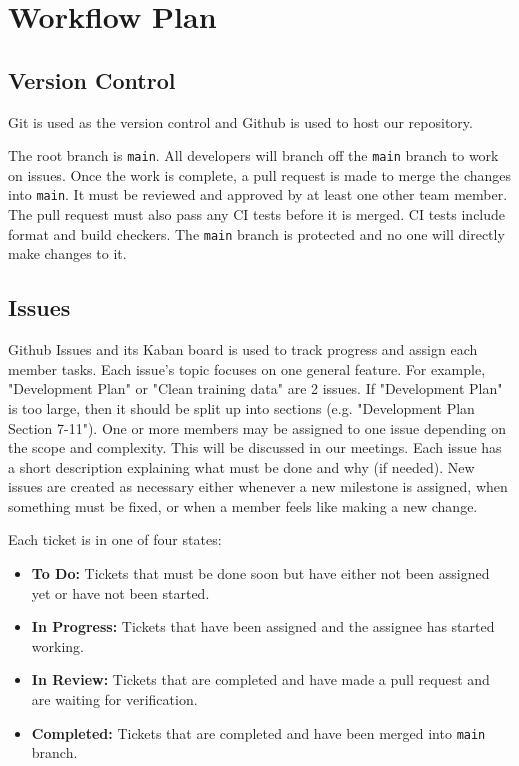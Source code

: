 \documentclass{article}
\begin{document}
\section{Workflow Plan}

\subsection{Version Control}
Git is used as the version control and Github is used to host our repository.

The root branch is \verb|main|. All developers will branch off the \verb|main| branch to work on
issues. Once the work is complete, a pull request is made to merge the changes into \verb|main|.
It must be reviewed and approved by at least one other team member. The pull request must also 
pass any CI tests before it is merged. CI tests include format and build checkers. The \verb|main| 
branch is protected and no one will directly make changes to it.

\subsection{Issues}
Github Issues and its Kaban board is used to track progress and assign each member tasks. Each 
issue's topic focuses on one general feature. For example, "Development Plan" or "Clean training 
data" are 2 issues. If "Development Plan" is too large, then it should be split up into sections
(e.g. "Development Plan Section 7-11"). One or more members may be assigned to one issue depending 
on the scope and complexity. This will be discussed in our meetings. Each issue has a short 
description explaining what must be done and why (if needed). New issues are created as necessary
either whenever a new milestone is assigned, when something must be fixed, or when a member
feels like making a new change.

Each ticket is in one of four states:
\begin{itemize}
  \item \textbf{To Do:} Tickets that must be done soon but have either not been assigned yet or have not been started.
  \item \textbf{In Progress:} Tickets that have been assigned and the assignee has started working.
  \item \textbf{In Review:} Tickets that are completed and have made a pull request and are waiting for verification.
  \item \textbf{Completed:} Tickets that are completed and have been merged into \verb|main| branch.
\end{itemize}
\end{document}
